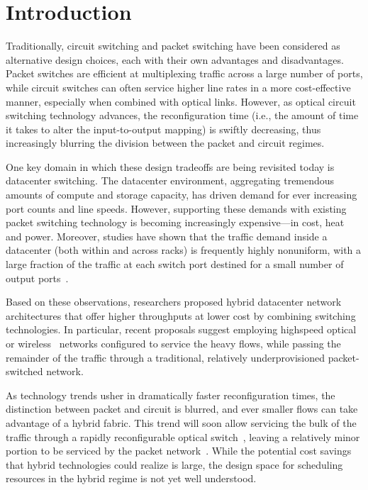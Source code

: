 \section{Introduction}

Traditionally, circuit switching and packet switching have been
considered as alternative design choices, each with their own advantages
and disadvantages. Packet switches are efficient at multiplexing traffic
across a large number of ports, while circuit switches can often service
higher line rates in a more cost-effective manner, especially when
combined with optical links. However, as optical circuit switching
technology advances, the reconfiguration time (i.e., the amount of time
it takes to alter the input-to-output mapping) is swiftly decreasing,
thus increasingly blurring the division between the packet and circuit
regimes.

One key domain in which these design tradeoffs are being revisited today
is datacenter switching. The datacenter environment, aggregating
tremendous amounts of compute and storage capacity, has driven demand
for ever increasing port counts and line speeds. However, supporting
these demands with existing packet switching technology is becoming
increasingly expensive—in cost, heat and power. Moreover, studies have
shown that the traffic demand inside a datacenter (both within and
across racks) is frequently highly nonuniform, with a large fraction of
the traffic at each switch port destined for a small number of output
ports~\cite{Kandula:2009-2}.

Based on these observations, researchers proposed hybrid datacenter
network architectures that offer higher throughputs at lower cost by
combining switching technologies. In particular, recent proposals
suggest employing highspeed optical~\cite{Chen:2012, Farrington:2010,
Wang:2010} or wireless~\cite{Halperin:2011, Kandula:2009, Zhou:2012}
networks configured to service the heavy flows, while passing the
remainder of the traffic through a traditional, relatively
underprovisioned packet-switched network. 

As technology trends usher in dramatically faster reconfiguration times,
the distinction between packet and circuit is blurred, and ever smaller
flows can take advantage of a hybrid fabric. This trend will soon allow
servicing the bulk of the traffic through a rapidly reconfigurable
optical switch~\cite{Porter:2013}, leaving a relatively minor portion to
be serviced by the packet network~\cite{Liu:2014}. While the potential
cost savings that hybrid technologies could realize is large, the design
space for scheduling resources in the hybrid regime is not yet well
understood. 

